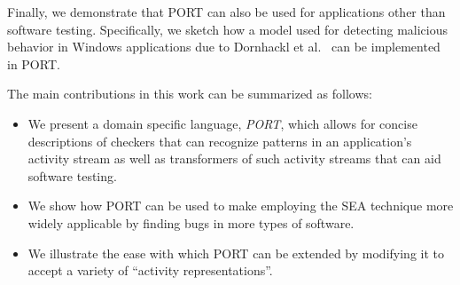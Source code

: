 Finally, we demonstrate that PORT can also be used for applications other than software testing.
Specifically, we sketch how a model used for
detecting malicious behavior in Windows applications due to Dornhackl et al.~\cite{Dornhackl2014} can be implemented in PORT.


The main contributions in this work can be summarized as follows:

\begin{itemize}

\item We present a domain specific language, {\em PORT},
  which allows for concise descriptions of checkers that can recognize patterns in
  an application's activity stream as well as transformers of such activity streams that can aid software testing.

\item We show how PORT can be used to make employing the SEA technique
  more widely applicable by finding bugs in more types of software.

\item We illustrate the ease with which PORT can be extended by modifying
  it to accept a variety of ``activity representations''.

\end{itemize}


